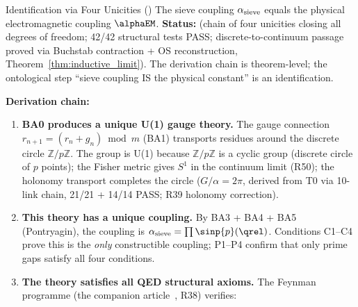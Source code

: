 \documentclass[12pt,a4paper]{article}
\begin{document}
\begin{thmbox}{Identification via Four Unicities (\BRIDGETAG)}
\label{thm:reconstruction}
The sieve coupling $\alpha_{\rm sieve}$ equals the physical
electromagnetic coupling $\alphaEM$.
\textbf{Status:} \BRIDGETAG{} (chain of four unicities closing all
degrees of freedom; 42/42 structural tests PASS; discrete-to-continuum
passage proved via Buchstab contraction + OS reconstruction,
Theorem~\ref{thm:inductive_limit}).
The derivation chain is theorem-level; the ontological step
``sieve coupling IS the physical constant'' is an identification.

\medskip\noindent\textbf{Derivation chain:}
\begin{enumerate}[leftmargin=*, label=\textbf{(\roman*)}]
\item \textbf{BA0 produces a unique U(1) gauge theory.}
  The gauge connection $r_{n+1} = (r_n + g_n) \bmod m$ (BA1)
  transports residues around the discrete circle $\mathbb{Z}/p\mathbb{Z}$.
  The group is U(1) because $\mathbb{Z}/p\mathbb{Z}$ is a cyclic
  group (discrete circle of $p$ points); the Fisher metric gives
  $S^1$ in the continuum limit (R50); the holonomy transport
  completes the circle ($G/\alpha = 2\pi$, derived from T0 via
  10-link chain, 21/21 + 14/14 PASS; R39 holonomy correction).

\item \textbf{This theory has a unique coupling.}
  By BA3 + BA4 + BA5 (Pontryagin), the coupling is
  $\alpha_{\rm sieve} = \prod \sinp{p}(\qrel)$.
  Conditions C1--C4 prove this is the \emph{only} constructible
  coupling; P1--P4 confirm that only prime gaps satisfy all four
  conditions.

\item \textbf{The theory satisfies all QED structural axioms.}
  The Feynman programme (the companion article~\cite{companion_physics}, R38) verifies:


\end{enumerate}
\end{thmbox}
\end{document}
